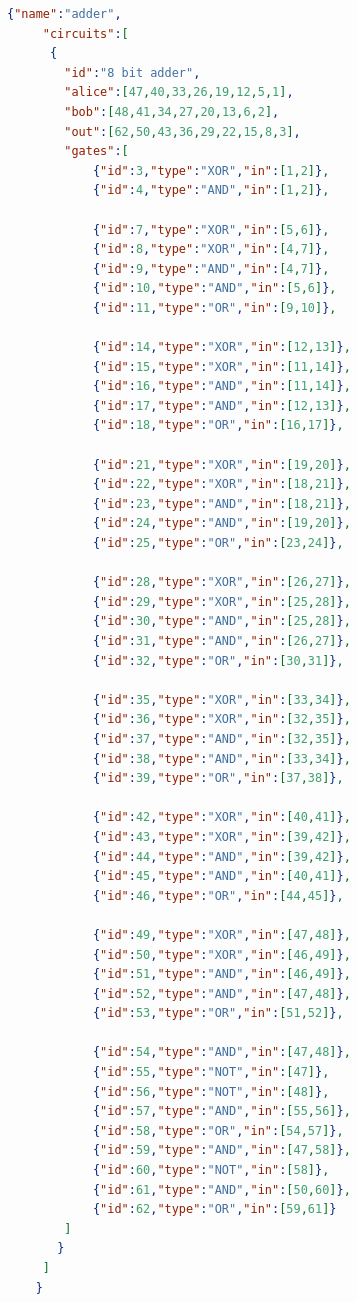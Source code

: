 \documentclass[12pt]{article}
\begin{document}
\begin{lstlisting}[language=json,firstnumber=1]
    {"name":"adder",
     "circuits":[
      {
        "id":"8 bit adder",
        "alice":[47,40,33,26,19,12,5,1],
        "bob":[48,41,34,27,20,13,6,2],
        "out":[62,50,43,36,29,22,15,8,3],
        "gates":[
            {"id":3,"type":"XOR","in":[1,2]},
            {"id":4,"type":"AND","in":[1,2]},

            {"id":7,"type":"XOR","in":[5,6]},
            {"id":8,"type":"XOR","in":[4,7]},
            {"id":9,"type":"AND","in":[4,7]},
            {"id":10,"type":"AND","in":[5,6]},
            {"id":11,"type":"OR","in":[9,10]},

            {"id":14,"type":"XOR","in":[12,13]},
            {"id":15,"type":"XOR","in":[11,14]},
            {"id":16,"type":"AND","in":[11,14]},
            {"id":17,"type":"AND","in":[12,13]},
            {"id":18,"type":"OR","in":[16,17]},
            
            {"id":21,"type":"XOR","in":[19,20]},
            {"id":22,"type":"XOR","in":[18,21]},
            {"id":23,"type":"AND","in":[18,21]},
            {"id":24,"type":"AND","in":[19,20]},
            {"id":25,"type":"OR","in":[23,24]},
            
            {"id":28,"type":"XOR","in":[26,27]},
            {"id":29,"type":"XOR","in":[25,28]},
            {"id":30,"type":"AND","in":[25,28]},
            {"id":31,"type":"AND","in":[26,27]},
            {"id":32,"type":"OR","in":[30,31]},
            
            {"id":35,"type":"XOR","in":[33,34]},
            {"id":36,"type":"XOR","in":[32,35]},
            {"id":37,"type":"AND","in":[32,35]},
            {"id":38,"type":"AND","in":[33,34]},
            {"id":39,"type":"OR","in":[37,38]},
            
            {"id":42,"type":"XOR","in":[40,41]},
            {"id":43,"type":"XOR","in":[39,42]},
            {"id":44,"type":"AND","in":[39,42]},
            {"id":45,"type":"AND","in":[40,41]},
            {"id":46,"type":"OR","in":[44,45]},
            
            {"id":49,"type":"XOR","in":[47,48]},
            {"id":50,"type":"XOR","in":[46,49]},
            {"id":51,"type":"AND","in":[46,49]},
            {"id":52,"type":"AND","in":[47,48]},
            {"id":53,"type":"OR","in":[51,52]},
            
            {"id":54,"type":"AND","in":[47,48]},
            {"id":55,"type":"NOT","in":[47]},
            {"id":56,"type":"NOT","in":[48]},
            {"id":57,"type":"AND","in":[55,56]},
            {"id":58,"type":"OR","in":[54,57]},
            {"id":59,"type":"AND","in":[47,58]},
            {"id":60,"type":"NOT","in":[58]},
            {"id":61,"type":"AND","in":[50,60]},
            {"id":62,"type":"OR","in":[59,61]}
        ]
       }
     ]
    }
    \end{lstlisting}
\end{document}
